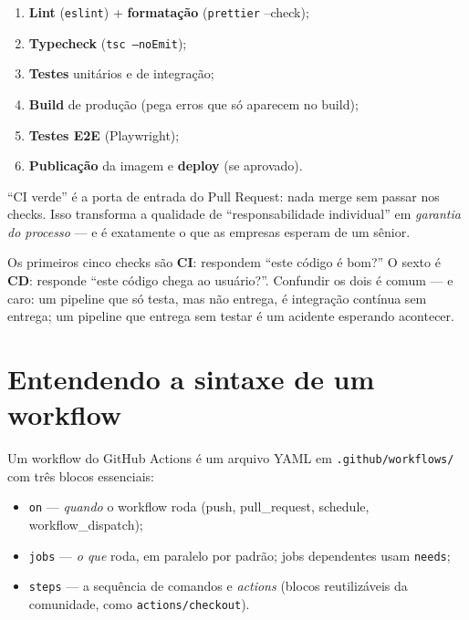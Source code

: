 \begin{enumerate}[leftmargin=*, itemsep=0.4em]
  \item \textbf{Lint} (\texttt{eslint}) + \textbf{formatação} (\texttt{prettier} --check);
  \item \textbf{Typecheck} (\texttt{tsc --noEmit});
  \item \textbf{Testes} unitários e de integração;
  \item \textbf{Build} de produção (pega erros que só aparecem no build);
  \item \textbf{Testes E2E} (Playwright);
  \item \textbf{Publicação} da imagem e \textbf{deploy} (se aprovado).
\end{enumerate}

\begin{caixaconceito}
``CI verde'' é a porta de entrada do Pull Request: nada merge sem passar nos
checks. Isso transforma a qualidade de ``responsabilidade individual'' em
\emph{garantia do processo} — e é exatamente o que as empresas esperam de um
sênior.
\end{caixaconceito}

\begin{caixadica}
Os primeiros cinco checks são \textbf{CI}: respondem ``este código é bom?''
O sexto é \textbf{CD}: responde ``este código chega ao usuário?''. Confundir
os dois é comum — e caro: um pipeline que só testa, mas não entrega, é
integração contínua sem entrega; um pipeline que entrega sem testar é um
acidente esperando acontecer.
\end{caixadica}

\section{Entendendo a sintaxe de um workflow}

Um workflow do GitHub Actions é um arquivo YAML em
\texttt{.github/workflows/} com três blocos essenciais:

\begin{itemize}[leftmargin=*, itemsep=0.4em]
  \item \texttt{on} — \emph{quando} o workflow roda (push, pull\_request, schedule, workflow\_dispatch);
  \item \texttt{jobs} — \emph{o que} roda, em paralelo por padrão; jobs dependentes usam \texttt{needs};
  \item \texttt{steps} — a sequência de comandos e \emph{actions} (blocos reutilizáveis da comunidade, como \texttt{actions/checkout}).
\end{itemize}

